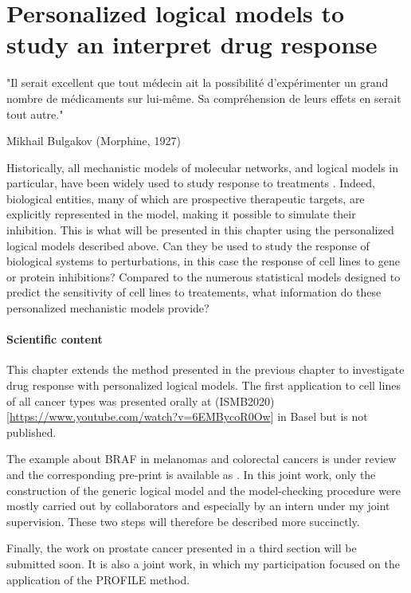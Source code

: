 \documentclass[a4paper,12pt,twoside,onecolumn,openright,final,oldfontcommands]{memoir}
\newcommand{\initial}[1]{
	\lettrine[lines=3,lhang=0.33,nindent=0em]{
		\color{gray}
     		{\textsc{#1}}}{}}
\let\BeginKnitrBlock\begin \let\EndKnitrBlock\end
\begin{document}
\chapter{Personalized logical models to study an interpret drug
response}\label{chap6}

\epigraph{"Il serait excellent que tout médecin ait la possibilité d'expérimenter un grand nombre de médicaments sur lui-même. Sa compréhension de leurs effets en serait tout autre."}{Mikhail Bulgakov (Morphine, 1927)}

\initial{H}istorically, all mechanistic models of molecular networks,
and logical models in particular, have been widely used to study
response to treatments
\citep{flobak2015discovery, jastrzebski2018integrative}. Indeed,
biological entities, many of which are prospective therapeutic targets,
are explicitly represented in the model, making it possible to simulate
their inhibition. This is what will be presented in this chapter using
the personalized logical models described above. Can they be used to
study the response of biological systems to perturbations, in this case
the response of cell lines to gene or protein inhibitions? Compared to
the numerous statistical models designed to predict the sensitivity of
cell lines to treatements, what information do these personalized
mechanistic models provide?

\BeginKnitrBlock{summarybox}
\subsubsection*{Scientific content}\label{scientific-content-3}

This chapter extends the method presented in the previous chapter to
investigate drug response with personalized logical models. The first
application to cell lines of all cancer types was presented orally at
(ISMB2020){[}\url{https://www.youtube.com/watch?v=6EMBycoR0Ow}{]} in
Basel but is not published.

The example about BRAF in melanomas and colorectal cancers is under
review and the corresponding pre-print is available as
\citet{beal2020personalized}. In this joint work, only the construction
of the generic logical model and the model-checking procedure were
mostly carried out by collaborators and especially by an intern under my
joint supervision. These two steps will therefore be described more
succinctly.

Finally, the work on prostate cancer presented in a third section will
be submitted soon. It is also a joint work, in which my participation
focused on the application of the PROFILE method.
\EndKnitrBlock{summarybox}
\end{document}
